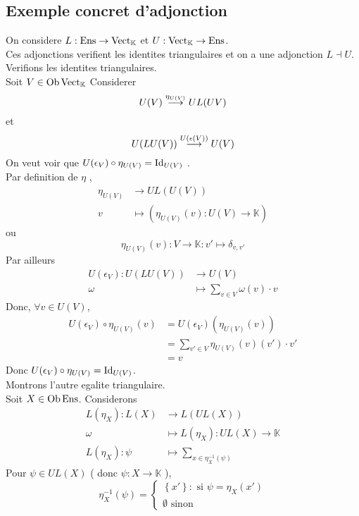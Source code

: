 \documentclass[../main.tex]{subfiles}
\begin{document}
\subsection{Exemple concret d'adjonction}
On considere $L: \operatorname{Ens} \to \operatorname{Vect}_\mathbb{K}$ et $ U : \operatorname{Vect}_{\mathbb{K}}\to \operatorname{Ens} $.\\
Ces adjonctions verifient les identites triangulaires et on a une adjonction $ L \dashv U$.\\
Verifions les identites triangulaires.\\
Soit $ V\in \operatorname{Ob} \operatorname{Vect}_\mathbb{K}$ Considerer
\[ 
	U( V) \overset{\eta_{U( V) } }{\longrightarrow} UL( UV) 
\]
et
\[ 
	U( LU( V) ) \overset{ U( \epsilon( V) ) }{\longrightarrow} U( V) 
\]
On veut voir que $U( \epsilon_V) \circ \eta_{U( V) }= \operatorname{Id}_{U( V) }  $ .\\
Par definition de $\eta$ ,
\begin{align*}
	\eta_{U( V) } &\to UL( U( V) ) \\
	v &\mapsto ( \eta_{U( V) }( v) : U( V) \to \mathbb{K} ) 
\end{align*}
ou 
\[ 
	\eta_{U( V) } ( v) : V \to \mathbb{K}: v' \mapsto \delta_{v,v'} 
\]
Par ailleurs
\begin{align*}
	U( \epsilon_V ) : U( LU( V)) &\to U( V) \\
	\omega &\mapsto \sum_{v\in V} \omega( v) \cdot v
\end{align*}
Donc, $\forall v \in U( V) $,
\begin{align*}
	U( \epsilon_V) \circ \eta_{U( V) } ( v) &= U( \epsilon_V) ( \eta_{U( V) } ( v) ) \\
						&= \sum_{v'\in V} \eta_{U( V) } ( v) ( v') \cdot v'\\
						&= v
\end{align*}
Donc $U( \epsilon_V) \circ \eta_{U( V) } = \operatorname{Id}_{U( V) } $.\\
\hr
Montrons l'autre egalite triangulaire.\\
Soit $X \in \operatorname{Ob} \operatorname{Ens}$. Considerons
\begin{align*}
	L( \eta_X) : L( X) &\to L( UL( X) )  \\
	\omega &\mapsto L( \eta_X) : UL( X) \to \mathbb{K}\\
	L( \eta_X) :\psi &\mapsto \sum_{x \in \eta_X^{-1}( \psi) } 
\end{align*}
Pour $\psi\in UL( X) $ ( donc $\psi:X \to \mathbb{K}$ ),
\[ 
	\eta_X^{-1}( \psi) =
	\begin{cases}
		\left\{ x' \right\} : \text{ si }  \psi= \eta_X( x') \\
		\emptyset \text{ sinon } 	
	\end{cases}
\]
\end{document}
